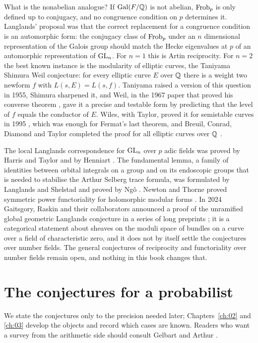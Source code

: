 What is the nonabelian analogue? If $\operatorname{Gal}(F/\mathbb{Q})$ is not abelian, $\operatorname{Frob}_p$ is only defined up to conjugacy, and no congruence condition on $p$ determines it. Langlands' proposal was that the correct replacement for a congruence condition is an automorphic form: the conjugacy class of $\operatorname{Frob}_p$ under an $n$ dimensional representation of the Galois group should match the Hecke eigenvalues at $p$ of an automorphic representation of $\mathrm{GL}_n$. For $n=1$ this is Artin reciprocity. For $n=2$ the best known instance is the modularity of elliptic curves, the Taniyama Shimura Weil conjecture: for every elliptic curve $E$ over $\mathbb{Q}$ there is a weight two newform $f$ with $L(s,E)=L(s,f)$. Taniyama raised a version of this question in 1955, Shimura sharpened it, and Weil, in the 1967 paper that proved his converse theorem \cite{weil1967}, gave it a precise and testable form by predicting that the level of $f$ equals the conductor of $E$. Wiles, with Taylor, proved it for semistable curves in 1995 \cite{wiles1995,taylorwiles1995}, which was enough for Fermat's last theorem, and Breuil, Conrad, Diamond and Taylor completed the proof for all elliptic curves over $\mathbb{Q}$ \cite{bcdt2001}.

The local Langlands correspondence for $\mathrm{GL}_n$ over $p$ adic fields was proved by Harris and Taylor and by Henniart \cite{harristaylor2001,henniart2000}. The fundamental lemma, a family of identities between orbital integrals on a group and on its endoscopic groups that is needed to stabilise the Arthur Selberg trace formula, was formulated by Langlands and Shelstad and proved by Ng\^o \cite{ngo2010}. Newton and Thorne proved symmetric power functoriality for holomorphic modular forms \cite{newtonthorne2021,newtonthorne2021b}. In 2024 Gaitsgory, Raskin and their collaborators announced a proof of the unramified global geometric Langlands conjecture in a series of long preprints \cite{gaitsgory2024}; it is a categorical statement about sheaves on the moduli space of bundles on a curve over a field of characteristic zero, and it does not by itself settle the conjectures over number fields. The general conjectures of reciprocity and functoriality over number fields remain open, and nothing in this book changes that.

\section{The conjectures for a probabilist}

We state the conjectures only to the precision needed later; Chapters~\ref{ch:02} and \ref{ch:03} develop the objects and record which cases are known. Readers who want a survey from the arithmetic side should consult Gelbart \cite{gelbart1984} and Arthur \cite{arthur2003}.

